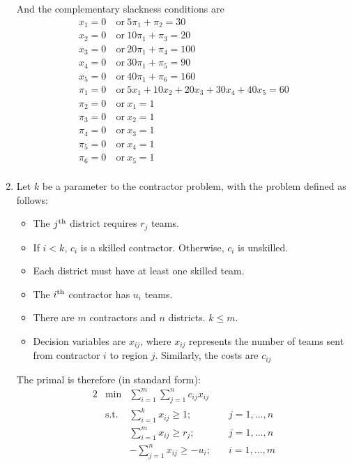 \documentclass[12pt]{article}
\begin{document}
\begin{enumerate}
    And the complementary slackness conditions are
    \begin{equation}
      \begin{split}
        x_1=0&\ \text{or}\ 5\pi_1+\pi_2=30\\
        x_2=0&\ \text{or}\ 10\pi_1+\pi_3=20\\
        x_3=0&\ \text{or}\ 20\pi_1+\pi_4=100\\
        x_4=0&\ \text{or}\ 30\pi_1+\pi_5=90\\
        x_5=0&\ \text{or}\ 40\pi_1+\pi_6=160\\
        \pi_1=0&\ \text{or}\ 5x_1+10x_2+20x_3+30x_4+40x_5=60\\
        \pi_2=0&\ \text{or}\ x_1=1\\
        \pi_3=0&\ \text{or}\ x_2=1\\
        \pi_4=0&\ \text{or}\ x_3=1\\
        \pi_5=0&\ \text{or}\ x_4=1\\
        \pi_6=0&\ \text{or}\ x_5=1\\
      \end{split}
    \end{equation}
  \item
    Let $k$ be a parameter to the contractor problem, with the problem
    defined as follows:
    \begin{itemize}
      \item The $j\textsuperscript{th}$ district requires $r_j$ teams.
      \item If $i<k$, $c_i$ is a skilled contractor. Otherwise, $c_i$ is
        unskilled.
      \item Each district must have at least one skilled team.
      \item The $i\textsuperscript{th}$ contractor has $u_i$ teams.
      \item There are $m$ contractors and $n$ districts. $k\leq m$.
      \item Decision variables are $x_{ij}$, where $x_{ij}$ represents the
        number of teams sent from contractor $i$ to region $j$. Similarly,
        the costs are $c_{ij}$
    \end{itemize}
    The primal is therefore (in standard form):
    \begin{alignat*}{2}
      &\text{min}&\sum_{i=1}^{m}\sum_{j=1}^{n}c_{ij}x_{ij}&\\
      &\text{s.t.}&\sum_{i=1}^kx_{ij}\geq1;\quad&j=1,\ldots,n\\
      &&\sum_{i=1}^mx_{ij}\geq r_j;\quad&j=1,\ldots,n\\
      &&-\sum_{j=1}^nx_{ij}\geq-u_i;\quad&i=1,\ldots,m\\
    \end{alignat*}


\end{enumerate}
\end{document}

